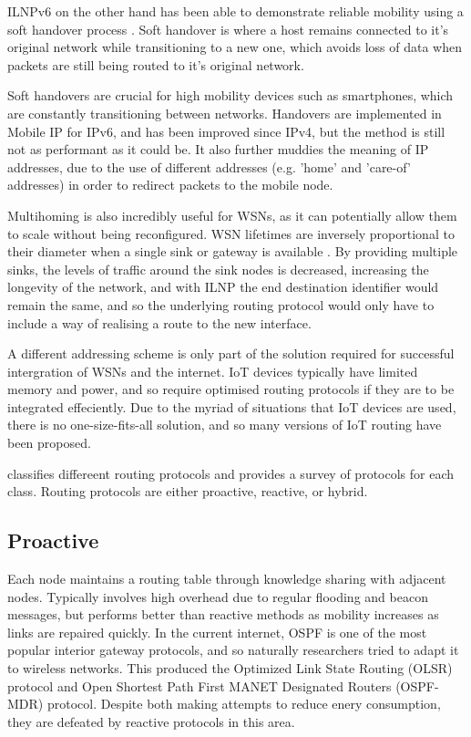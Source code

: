 \documentclass[12pt]{article}
\begin{document}
ILNPv6 on the other hand has been able to demonstrate reliable mobility using a soft handover process \cite{shilnp}. Soft handover is where a host remains connected to it's original network while transitioning to a new one, which avoids loss of data when packets are still being routed to it's original network. 

Soft handovers are crucial for high mobility devices such as smartphones, which are constantly transitioning between networks. Handovers are implemented in Mobile IP for IPv6, and has been improved since IPv4, but the method is still not as performant as it could be. It also further muddies the meaning of IP addresses, due to the use of different addresses (e.g. 'home' and 'care-of' addresses) in order to redirect packets to the mobile node. 

Multihoming is also incredibly useful for WSNs, as it can potentially allow them to scale without being reconfigured. WSN lifetimes are inversely proportional to their diameter when a single sink or gateway is available \cite{multisink}. By providing multiple sinks, the levels of traffic around the sink nodes is decreased, increasing the longevity of the network, and with ILNP the end destination identifier would remain the same, and so the underlying routing protocol would only have to include a way of realising a route to the new interface.

A different addressing scheme is only part of the solution required for successful intergration of WSNs and the internet. IoT devices typically have limited memory and power, and so require optimised routing protocols if they are to be integrated effeciently. Due to the myriad of situations that IoT devices are used, there is no one-size-fits-all solution, and so many versions of IoT routing have been proposed.

\cite{hassan} classifies differeent routing protocols and provides a survey of protocols for each class. Routing protocols are either proactive, reactive, or hybrid. 

\subsection{Proactive} 
Each node maintains a routing table through knowledge sharing with adjacent nodes. Typically involves high overhead due to regular flooding and beacon messages, but performs better than reactive methods as mobility increases as links are repaired quickly. In the current internet, OSPF is one of the most popular interior gateway protocols, and so naturally researchers tried to adapt it to wireless networks. This produced the Optimized Link State Routing (OLSR) protocol \cite{olsr} and Open Shortest Path First MANET Designated Routers (OSPF-MDR) protocol. Despite both making attempts to reduce enery consumption, they are defeated by reactive protocols in this area. 
\end{document}
